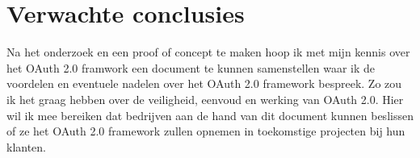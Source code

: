\section{Verwachte conclusies}	
\label{sec:verwachte_conclusies}

Na het onderzoek en een proof of concept te maken hoop ik met mijn kennis over het OAuth 2.0 framwork een document te kunnen samenstellen waar ik de voordelen en eventuele nadelen over het OAuth 2.0 framework bespreek. Zo zou ik het graag hebben over de veiligheid, eenvoud en werking van OAuth 2.0. Hier wil ik mee bereiken dat bedrijven aan de hand van dit document kunnen beslissen of ze het OAuth 2.0 framework zullen opnemen in toekomstige projecten bij hun klanten.


